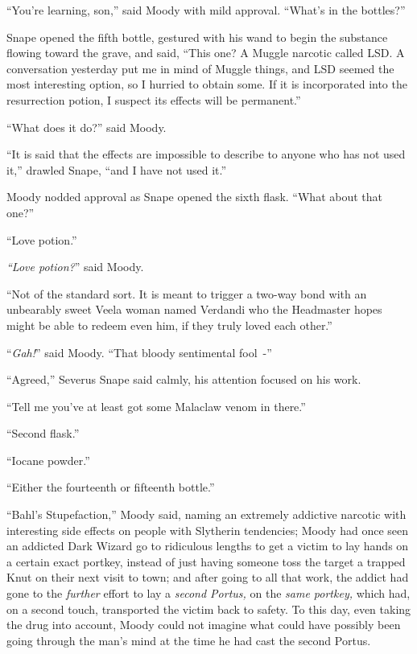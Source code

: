 ``You're learning, son,'' said Moody with mild approval. ``What's in the bottles?''

Snape opened the fifth bottle, gestured with his wand to begin the substance flowing toward the grave, and said, ``This one? A Muggle narcotic called LSD. A conversation yesterday put me in mind of Muggle things, and LSD seemed the most interesting option, so I hurried to obtain some. If it is incorporated into the resurrection potion, I suspect its effects will be permanent.''

``What does it do?'' said Moody.

``It is said that the effects are impossible to describe to anyone who has not used it,'' drawled Snape, ``and I have not used it.''

Moody nodded approval as Snape opened the sixth flask. ``What about that one?''

``Love potion.''

\emph{``Love potion?}'' said Moody.

``Not of the standard sort. It is meant to trigger a two-way bond with an unbearably sweet Veela woman named Verdandi who the Headmaster hopes might be able to redeem even him, if they truly loved each other.''

``\emph{Gah!}'' said Moody. ``That bloody sentimental fool~-''

``Agreed,'' Severus Snape said calmly, his attention focused on his work.

``Tell me you've at least got some Malaclaw venom in there.''

``Second flask.''

``Iocane powder.''

``Either the fourteenth or fifteenth bottle.''

``Bahl's Stupefaction,'' Moody said, naming an extremely addictive narcotic with interesting side effects on people with Slytherin tendencies; Moody had once seen an addicted Dark Wizard go to ridiculous lengths to get a victim to lay hands on a certain exact portkey, instead of just having someone toss the target a trapped Knut on their next visit to town; and after going to all that work, the addict had gone to the \emph{further} effort to lay a \emph{second Portus,} on the \emph{same portkey,} which had, on a second touch, transported the victim back to safety. To this day, even taking the drug into account, Moody could not imagine what could have possibly been going through the man's mind at the time he had cast the second Portus.

